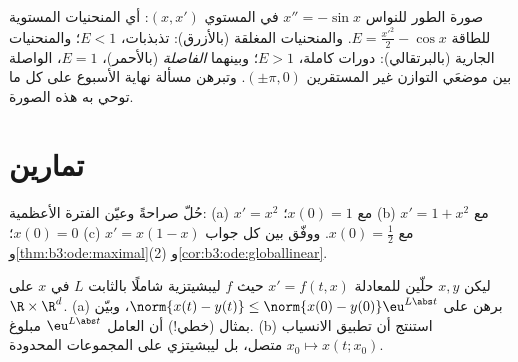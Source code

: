 \begin{omfigure}

{\small صورة الطور للنواس $x'' = -\sin x$ في المستوي
$(x, x')$: أي المنحنيات المستوية للطاقة $E = \frac{x'^2}2
- \cos x$. والمنحنيات
المغلقة (بالأزرق): تذبذبات، $E < 1$؛ والمنحنيات الجارية
(بالبرتقالي): دورات كاملة، $E > 1$؛ وبينهما \emph{الفاصلة}
(بالأحمر)، $E = 1$، الواصلة بين موضعَي التوازن غير المستقرين
$(\pm\pi, 0)$. وتبرهن مسألة نهاية الأسبوع على كل ما توحي به هذه
الصورة.}
\end{omfigure}

\section{تمارين}

\begin{exercise}[$\star$]\label{exo:b3:ode:1}
حُلّ صراحةً وعيّن الفترة الأعظمية:
(a) $x' = x^2$ مع $x(0) = 1$؛ (b) $x' = 1 + x^2$ مع
$x(0) = 0$؛ (c) $x' = x(1-x)$ مع $x(0) = \frac12$. ووفّق بين كل
جواب و\cref{thm:b3:ode:maximal}(2) و\cref{cor:b3:ode:globallinear}.
\end{exercise}

\begin{exercise}[$\star$]\label{exo:b3:ode:2}
ليكن $x, y$ حلّين للمعادلة $x' = f(t,x)$ حيث $f$ ليبشيتزية
شاملًا بالثابت $L$ في $x$ على $\R\times\R^d$.
(a) برهن على $\norm{x(t) - y(t)} \leq \norm{x(0) -
y(0)}\eu^{L\abs t}$، وبيّن بمثال (خطي!) أن العامل
$\eu^{L\abs t}$ مبلوغ.
(b) استنتج أن تطبيق الانسياب $x_0 \mapsto x(t; x_0)$ متصل، بل ليبشيتزي على
المجموعات المحدودة.
\end{exercise}

